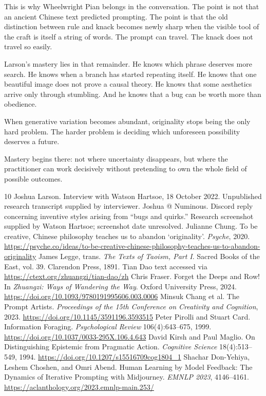 \documentclass[11pt]{article}
\begin{document}
This is why Wheelwright Pian belongs in the conversation. The point is not that an ancient Chinese text predicted prompting. The point is that the old distinction between rule and knack becomes newly sharp when the visible tool of the craft is itself a string of words. The prompt can travel. The knack does not travel so easily.

Larson's mastery lies in that remainder. He knows which phrase deserves more search. He knows when a branch has started repeating itself. He knows that one beautiful image does not prove a causal theory. He knows that some aesthetics arrive only through stumbling. And he knows that a bug can be worth more than obedience.

When generative variation becomes abundant, originality stops being the only hard problem. The harder problem is deciding which unforeseen possibility deserves a future.

Mastery begins there: not where uncertainty disappears, but where the practitioner can work decisively without pretending to own the whole field of possible outcomes.

\begin{thebibliography}{10}
 Joshua Larson. Interview with Watson Hartsoe, 18 October 2022. Unpublished research transcript supplied by interviewer.
 Joshua @ Numinous. Discord reply concerning inventive styles arising from ``bugs and quirks.'' Research screenshot supplied by Watson Hartsoe; screenshot date unresolved.
 Julianne Chung. To be creative, Chinese philosophy teaches us to abandon `originality'. \emph{Psyche}, 2020. \url{https://psyche.co/ideas/to-be-creative-chinese-philosophy-teaches-us-to-abandon-originality}
 James Legge, trans. \emph{The Texts of Taoism, Part I}. Sacred Books of the East, vol. 39. Clarendon Press, 1891. Tian Dao text accessed via \url{https://ctext.org/zhuangzi/tian-dao/zh}
 Chris Fraser. Forget the Deeps and Row! In \emph{Zhuangzi: Ways of Wandering the Way}. Oxford University Press, 2024. \url{https://doi.org/10.1093/9780191995606.003.0006}
 Minsuk Chang et al. The Prompt Artists. \emph{Proceedings of the 15th Conference on Creativity and Cognition}, 2023. \url{https://doi.org/10.1145/3591196.3593515}
 Peter Pirolli and Stuart Card. Information Foraging. \emph{Psychological Review} 106(4):643--675, 1999. \url{https://doi.org/10.1037/0033-295X.106.4.643}
 David Kirsh and Paul Maglio. On Distinguishing Epistemic from Pragmatic Action. \emph{Cognitive Science} 18(4):513--549, 1994. \url{https://doi.org/10.1207/s15516709cog1804_1}
 Shachar Don-Yehiya, Leshem Choshen, and Omri Abend. Human Learning by Model Feedback: The Dynamics of Iterative Prompting with Midjourney. \emph{EMNLP 2023}, 4146--4161. \url{https://aclanthology.org/2023.emnlp-main.253/}
\end{thebibliography}
\end{document}
